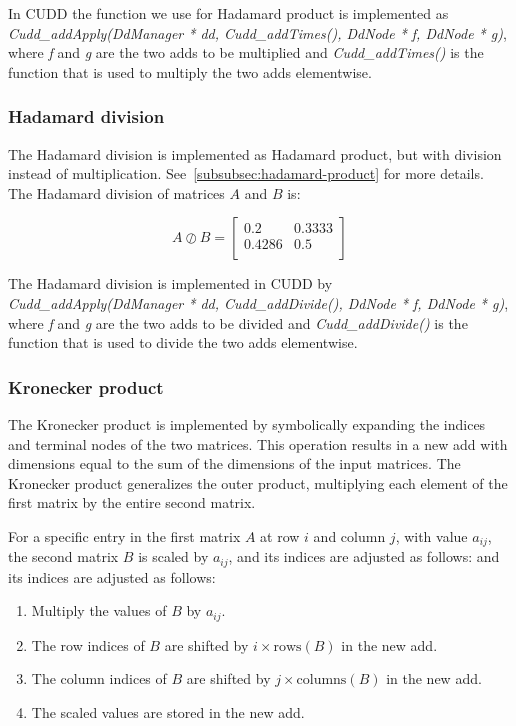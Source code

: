 In CUDD the function we use for Hadamard product is implemented as \textit{Cudd\_addApply(DdManager * dd, Cudd\_addTimes(), DdNode * f, DdNode * g)}, where \textit{f} and \textit{g} are the two \glspl{add} to be multiplied and \textit{Cudd\_addTimes()} is the function that is used to multiply the two \glspl{add} elementwise.

\subsubsection{Hadamard division}
The Hadamard division is implemented as Hadamard product, but with division instead of multiplication. See~\autoref{subsubsec:hadamard-product} for more details.
The Hadamard division of matrices $A$ and $B$ is:

\[
    A \oslash B = \begin{bmatrix}
        0.2    & 0.3333 \\
        0.4286 & 0.5    \\
    \end{bmatrix}
\]

The Hadamard division is implemented in CUDD by \textit{Cudd\_addApply(DdManager * dd, Cudd\_addDivide(), DdNode * f, DdNode * g)}, where \textit{f} and \textit{g} are the two \glspl{add} to be divided and \textit{Cudd\_addDivide()} is the function that is used to divide the two \glspl{add} elementwise.

\subsubsection{Kronecker product}
The Kronecker product is implemented by symbolically expanding the indices and terminal nodes of the two matrices.
This operation results in a new \gls{add} with dimensions equal to the sum of the dimensions of the input matrices. 
The Kronecker product generalizes the outer product, multiplying each element of the first matrix by the entire second matrix.

For a specific entry in the first matrix $A$ at row $i$ and column $j$, with value $a_{ij}$, the second matrix $B$ is scaled by $a_{ij}$, and its indices are adjusted as follows:
and its indices are adjusted as follows:
\begin{enumerate}
\item Multiply the values of $B$ by $a_{ij}$.
\item The row indices of $B$ are shifted by $i \times \text{rows}(B)$ in the new \gls{add}.
\item The column indices of $B$ are shifted by $j \times \text{columns}(B)$ in the new \gls{add}.
\item The scaled values are stored in the new \gls{add}.
\end{enumerate}


